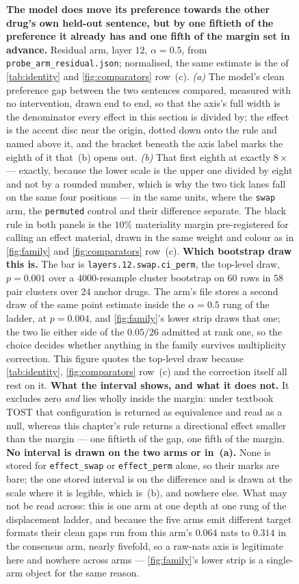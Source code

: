 \begin{figure}[htbp]
\centering

\caption[The effect and its gap]{\textbf{The model does move its preference
towards the other drug's own held-out sentence, but by one fiftieth of the
preference it already has and one fifth of the margin set in advance.}
Residual arm, layer $12$, $\alpha = 0.5$, from
\texttt{probe\_arm\_residual.json}; normalised, the same estimate is the
 of \cref{tab:identity} and
\cref{fig:comparators} row~(c). \emph{(a)} The model's clean preference gap
between the two sentences compared, measured with no intervention, drawn end to
end, so that the axis's full width is the denominator every effect in this
section is divided by; the effect is the accent disc near the origin, dotted
down onto the rule and named above it, and the bracket beneath the axis label
marks the eighth of it that~(b) opens out. \emph{(b)} That first eighth at
exactly $8\times$ --- exactly, because the lower scale is the upper one divided
by eight and not by a rounded number, which is why the two tick lanes fall on
the same four positions --- in the same units, where the \texttt{swap} arm, the
\texttt{permuted} control and their difference separate. The black rule in both
panels is the $10\%$ materiality margin pre-registered for calling an effect
material, drawn in the same weight and colour as in \cref{fig:family} and
\cref{fig:comparators} row~(c). \textbf{Which bootstrap draw this is.} The bar
is \texttt{layers.12.swap.ci\_perm}, the top-level draw, $p = 0.001$ over a
$4000$-resample cluster bootstrap on $60$ rows in $58$ pair clusters over $24$
anchor drugs. The arm's file stores a second draw of the same point estimate
inside the $\alpha = 0.5$ rung of the ladder, at $p = 0.004$, and
\cref{fig:family}'s lower strip draws that one; the two lie either side of the
$0.05/26$ admitted at rank one, so the choice decides whether anything in the
family survives multiplicity correction. This figure quotes the top-level draw
because \cref{tab:identity}, \cref{fig:comparators} row~(c) and the correction
itself all rest on it. \textbf{What the interval shows, and what it does not.}
It excludes zero \emph{and} lies wholly inside the margin: under textbook TOST
that configuration is returned as equivalence and read as a null, whereas this
chapter's rule returns a directional effect smaller than the margin --- one
fiftieth of the gap, one fifth of the margin. \textbf{No interval is drawn on
the two arms or in~(a).} None is stored for \texttt{effect\_swap} or
\texttt{effect\_perm} alone, so their marks are bare; the one stored interval
is on the difference and is drawn at the scale where it is legible, which
is~(b), and nowhere else. What may not be read across: this is one arm at one
depth at one rung of the displacement ladder, and because the five arms emit
different target formats their clean gaps run from this arm's $0.064$ nats to
$0.314$ in the consensus arm, nearly fivefold, so a raw-nats axis is legitimate
here and nowhere across arms --- \cref{fig:family}'s lower strip is a
single-arm object for the same reason.}
\label{fig:materiality}
\end{figure}

